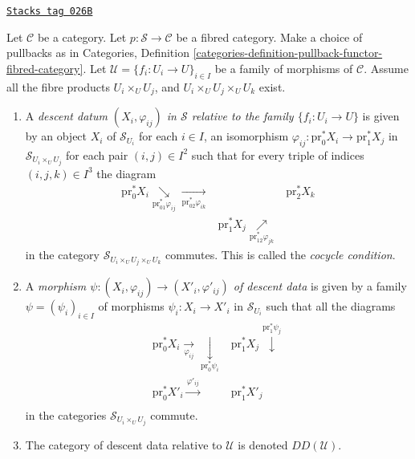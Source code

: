 \begin{definition}
\label{stacks-definition-descent-data}
\href{https://stacks.math.columbia.edu/tag/026B}{\texttt{Stacks tag 026B}}

Let $\mathcal{C}$ be a category.
Let $p : \mathcal{S} \to \mathcal{C}$ be a fibred category.
Make a choice of pullbacks as in Categories,
Definition \ref{categories-definition-pullback-functor-fibred-category}.
Let $\mathcal{U} = \{f_i : U_i \to U\}_{i \in I}$
be a family of morphisms of $\mathcal{C}$. Assume all the fibre products
$U_i \times_U U_j$, and $U_i \times_U U_j \times_U U_k$ exist.
\begin{enumerate}
\item A {\it descent datum $(X_i, \varphi_{ij})$ in $\mathcal{S}$
relative to the family $\{f_i : U_i \to U\}$} is given by an object $X_i$
of $\mathcal{S}_{U_i}$ for each $i \in I$, an isomorphism
$\varphi_{ij} : \text{pr}_0^*X_i \to \text{pr}_1^*X_j$
in $\mathcal{S}_{U_i \times_U U_j}$ for each pair $(i, j) \in I^2$
such that for every triple of indices $(i, j, k) \in I^3$ the
diagram
$$
\begin{array}{ccc}\text{pr}_0^*X_i \underset{\text{pr}_{01}^*\varphi_{ij}}{\searrow}\underset{\text{pr}_{02}^*\varphi_{ik}}{\longrightarrow} &  & \text{pr}_2^*X_k \\  & \text{pr}_1^*X_j \underset{\text{pr}_{12}^*\varphi_{jk}}{\nearrow} & \end{array}
$$
in the category $\mathcal{S}_{U_i \times_U U_j \times_U U_k}$
commutes. This is called the {\it cocycle condition}.
\item A {\it morphism $\psi : (X_i, \varphi_{ij}) \to
(X'_i, \varphi'_{ij})$ of descent data} is given
by a family $\psi = (\psi_i)_{i\in I}$ of morphisms
$\psi_i : X_i \to X'_i$ in $\mathcal{S}_{U_i}$
such that all the diagrams
$$
\begin{array}{cc}\text{pr}_0^*X_i \underset{\varphi_{ij}}{\longrightarrow}\underset{\text{pr}_0^*\psi_i}{\downarrow} & \text{pr}_1^*X_j \overset{\text{pr}_1^*\psi_j}{\downarrow} \\ \text{pr}_0^*X'_i \overset{\varphi'_{ij}}{\longrightarrow} & \text{pr}_1^*X'_j \\  & \end{array}
$$
in the categories $\mathcal{S}_{U_i \times_U U_j}$ commute.
\item The category of descent data relative to
$\mathcal{U}$ is denoted $DD(\mathcal{U})$.
\end{enumerate}
\end{definition}

